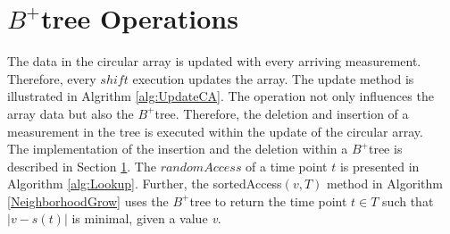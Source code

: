 \documentclass[abstracton,12pt,oneside]{scrreprt}
\begin{document}
\section{$B^+$tree Operations}
\label{sec:OperationsOnBTree}
The data in the circular array is updated with every arriving measurement. Therefore, every $shift$ execution updates the array. The update method is illustrated in Algrithm \ref{alg:UpdateCA}. The operation not only influences the array data but also the $B^+$tree. Therefore, the deletion and insertion of a measurement in the tree is executed within the update of the circular array.\\ The implementation of the insertion and the deletion within a $B^+$tree is described in Section \ref{sec:OperationsOnBTree}. The $randomAccess$ of a time point $t$ is presented in Algorithm \ref{alg:Lookup}.
Further, the sortedAccess$(v,T)$ method in Algorithm \ref{NeighborhoodGrow} uses the $B^+$tree to return the time point $t \in T$ such that $|v-s(t)|$ is minimal, given a value \emph{v}.
\end{document}
